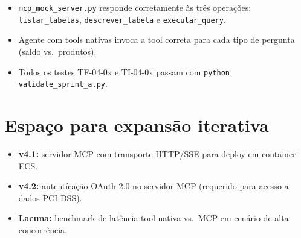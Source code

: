 \begin{itemize}[leftmargin=*]
  \item \texttt{mcp\_mock\_server.py} responde corretamente \`as tr\^es
        opera\c{c}\~oes: \texttt{listar\_tabelas},
        \texttt{descrever\_tabela} e \texttt{executar\_query}.
  \item Agente com tools nativas invoca a tool correta para cada
        tipo de pergunta (saldo vs.\ produtos).
  \item Todos os testes TF-04-0x e TI-04-0x passam com
        \texttt{python validate\_sprint\_a.py}.
\end{itemize}

\section{Espa\c{c}o para expans\~ao iterativa}

\begin{itemize}[leftmargin=*]
  \item \textbf{v4.1:} servidor MCP com transporte HTTP/SSE para
        deploy em container ECS.
  \item \textbf{v4.2:} autent\'ica\c{c}\~ao OAuth 2.0 no servidor
        MCP (requerido para acesso a dados PCI-DSS).
  \item \textbf{Lacuna:} benchmark de lat\^encia tool nativa vs.\
        MCP em cen\'ario de alta concorr\^encia.
\end{itemize}
